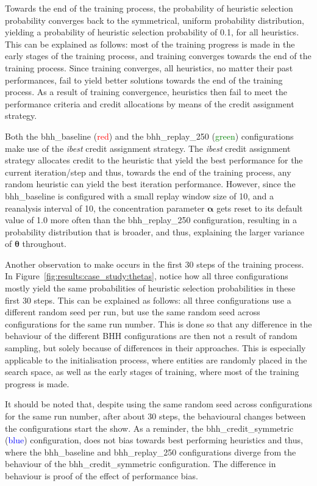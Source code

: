 Towards the end of the training process, the probability of heuristic selection probability converges back to the symmetrical, uniform probability distribution, yielding a probability of heuristic selection probability of 0.1, for all heuristics. This can be explained as follows: most of the training progress is made in the early stages of the training process, and training converges towards the end of the training process. Since training converges, all heuristics, no matter their past performances, fail to yield better solutions towards the end of the training process. As a result of training convergence, heuristics then fail to meet the performance criteria and credit allocations by means of the credit assignment strategy.

Both the bhh\_baseline (\textcolor{red}{red}) and the bhh\_replay\_250 (\textcolor{green}{green}) configurations make use of the \textit{ibest} credit assignment strategy. The \textit{ibest} credit assignment strategy allocates credit to the heuristic that yield the best performance for the current iteration/step and thus, towards the end of the training process, any random heuristic can yield the best iteration performance. However, since the bhh\_baseline is configured with a small replay window size of 10, and a reanalysis interval of 10, the concentration parameter $\boldsymbol{\alpha}$ gets reset to its default value of 1.0 more often than the bhh\_replay\_250 configuration, resulting in a probability distribution that is broader, and thus, explaining the larger variance of $\boldsymbol{\theta}$ throughout.

Another observation to make occurs in the first 30 steps of the training process. In Figure~\ref{fig:results:case_study:thetas}, notice how all three configurations mostly yield the same probabilities of heuristic selection probabilities in these first 30 steps. This can be explained as follows: all three configurations use a different random seed per run, but use the same random seed across configurations for the same run number. This is done so that any difference in the behaviour of the different \acs{BHH} configurations are then not a result of random sampling, but solely because of differences in their approaches. This is especially applicable to the initialisation process, where entities are randomly placed in the search space, as well as the early stages of training, where most of the training progress is made.

It should be noted that, despite using the same random seed across configurations for the same run number, after about 30 steps, the behavioural changes between the configurations start the show. As a reminder, the bhh\_credit\_symmetric (\textcolor{blue}{blue}) configuration, does not bias towards best performing heuristics and thus, where the bhh\_baseline and bhh\_replay\_250 configurations diverge from the behaviour of the bhh\_credit\_symmetric configuration. The difference in behaviour is proof of the effect of performance bias.

